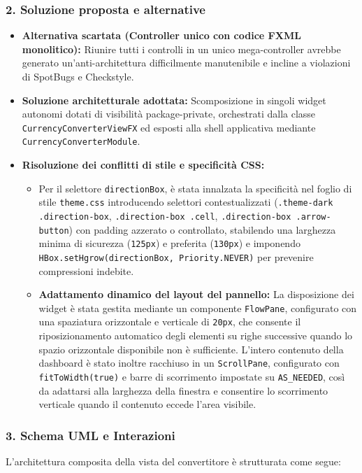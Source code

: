 \documentclass[11pt,a4paper,openright]{report}
\begin{document}
\subsubsection*{2. Soluzione proposta e alternative}
\begin{itemize}
  \item \textbf{Alternativa scartata (Controller unico con codice FXML monolitico):} Riunire tutti i controlli in un unico mega-controller avrebbe generato un'anti-architettura difficilmente manutenibile e incline a violazioni di SpotBugs e Checkstyle.
  \item \textbf{Soluzione architetturale adottata:} Scomposizione in singoli widget autonomi dotati di visibilità package-private, orchestrati dalla classe \texttt{CurrencyConverterViewFX} ed esposti alla shell applicativa mediante \texttt{CurrencyConverterModule}.
  \item \textbf{Risoluzione dei conflitti di stile e specificità CSS:}
  \begin{itemize}
    \item Per il selettore \texttt{directionBox}, è stata innalzata la specificità nel foglio di stile \texttt{theme.css} introducendo selettori contestualizzati (\texttt{.theme-dark .direction-box}, \texttt{.direction-box .cell}, \texttt{.direction-box .arrow-button}) con padding azzerato o controllato, stabilendo una larghezza minima di sicurezza (\texttt{125px}) e preferita (\texttt{130px}) e imponendo \texttt{HBox.setHgrow(directionBox, Priority.NEVER)} per prevenire compressioni indebite.
    \item \textbf{Adattamento dinamico del layout del pannello:} La disposizione dei widget è stata gestita mediante un componente \texttt{FlowPane}, configurato con una spaziatura orizzontale e verticale di \texttt{20px}, che consente il riposizionamento automatico degli elementi su righe successive quando lo spazio orizzontale disponibile non è sufficiente. L'intero contenuto della dashboard è stato inoltre racchiuso in un \texttt{ScrollPane}, configurato con \texttt{fitToWidth(true)} e barre di scorrimento impostate su \texttt{AS\_NEEDED}, così da adattarsi alla larghezza della finestra e consentire lo scorrimento verticale quando il contenuto eccede l'area visibile.
  \end{itemize}
\end{itemize}

\subsubsection*{3. Schema UML e Interazioni}
L'architettura composita della vista del convertitore è strutturata come segue:
\end{document}
